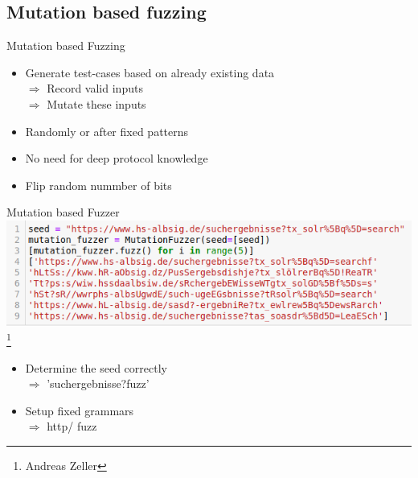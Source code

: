 \documentclass{beamer}
\begin{document}
\subsection{Mutation based fuzzing}
\begin{frame}{Mutation based Fuzzing}
\begin{itemize}
 \item Generate test-cases based on already existing data\\
 $\Rightarrow$ Record valid inputs\\
 $\Rightarrow$ Mutate these inputs
 \item Randomly or after fixed patterns
 \item No need for deep protocol knowledge
 \item Flip random nummber of bits
 
 
\end{itemize}
\end{frame}
\begin{frame}{Mutation based Fuzzer}
\includegraphics[scale=0.5]{mutatate.png}\footnote{Andreas Zeller}
\end{frame}
\begin{frame}
 \begin{itemize}
 \item Determine the seed correctly\\
 $\Rightarrow$ 'suchergebnisse?fuzz'
  \item Setup fixed grammars\\
  $\Rightarrow$ http/
  fuzz
 \end{itemize}
 
\end{frame}
\end{document}
